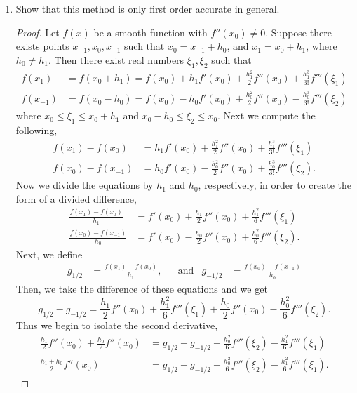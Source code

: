\documentclass{article}
\begin{document}
\begin{enumerate}[label = \arabic*]
\begin{enumerate}
			\item Show that this method is only first order accurate in general.
			
			\begin{proof}
				Let $f(x)$ be a smooth function with $f''(x_0) \neq 0$. Suppose there exists points $x_{-1}, x_{0}, x_{-1}$ such that $x_{0} = x_{-1} + h_0$, and $x_1 = x_0 + h_1$, where $h_0 \neq h_1$. Then there exist real numbers $\xi_1, \xi_2$ such that
				\begin{align*}
					f(x_1)	  &= f(x_0 + h_1) = f(x_0) + h_1 f'(x_0) + \frac{h_1^2}{2}f''(x_0) + \frac{h_1^3}{3!} f'''(\xi_1) \\
					f(x_{-1}) &= f(x_0 - h_0) = f(x_0) - h_0 f'(x_0) + \frac{h_0^2}{2}f''(x_0) - \frac{h_0^3}{3!} f'''(\xi_2)
				\end{align*}
				where $x_0 \leq \xi_1 \leq x_0 + h_1$ and $x_0 - h_0 \leq \xi_2 \leq x_0$. Next we compute the following, 
				\begin{align*}
					f(x_1) - f(x_0)    &= h_1 f'(x_0) + \frac{h_1^2}{2}f''(x_0) + \frac{h_1^3}{3!} f'''(\xi_1) \\
					f(x_0) - f(x_{-1}) &= h_0 f'(x_0) - \frac{h_0^2}{2}f''(x_0) + \frac{h_0^3}{3!} f'''(\xi_2). 
				\end{align*}
				Now we divide the equations by $h_1$ and $h_0$, respectively, in order to create the form of a divided difference,
				\begin{align*}
					\frac{f(x_1) - f(x_0)}{h_1}    &= f'(x_0) + \frac{h_1}{2}f''(x_0) + \frac{h_1^2}{6} f'''(\xi_1) \\
					\frac{f(x_0) - f(x_{-1})}{h_0} &= f'(x_0) - \frac{h_0}{2}f''(x_0) + \frac{h_0^2}{6} f'''(\xi_2). 
				\end{align*}
				Next, we define 
				\begin{align*}
					g_{1/2} &= \frac{f(x_1) - f(x_0)}{h_1}, & &\text{and} & g_{-1/2} &= \frac{f(x_0) - f(x_{-1})}{h_0}
				\end{align*}
				Then, we take the difference of these equations and we get \[g_{1/2} - g_{-1/2} = \frac{h_1}{2}f''(x_0) + \frac{h_1^2}{6} f'''(\xi_1) + \frac{h_0}{2}f''(x_0) - \frac{h_0^2}{6} f'''(\xi_2).\] Thus we begin to isolate the second derivative,
				\begin{align*}
					\frac{h_1}{2}f''(x_0) + \frac{h_0}{2}f''(x_0) &= g_{1/2} - g_{-1/2} + \frac{h_0^2}{6} f'''(\xi_2) - \frac{h_1^2}{6} f'''(\xi_1) \\
					\frac{h_1 + h_0}{2}f''(x_0) &= g_{1/2} - g_{-1/2} + \frac{h_0^2}{6} f'''(\xi_2) - \frac{h_1^2}{6} f'''(\xi_1).

\end{align*}
\end{proof}
\end{enumerate}
\end{enumerate}
\end{document}
